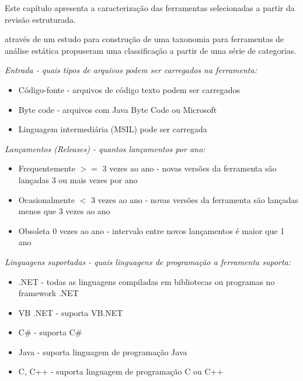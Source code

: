 {Este capítulo apresenta a caracterização das ferramentas selecionadas a partir
da revisão estruturada.}
\label{caracterizacao-ferramentas}

 através de um estudo para construção de uma taxonomia
para ferramentas de análise estática propuseram uma classificação a partir de
uma série de categorias.

\begin{description}

  \item {\it Entrada - quais tipos de arquivos podem ser carregados na ferramenta:}
    \begin{itemize}
      \item Código-fonte - arquivos de código texto podem ser carregados
      \item Byte code - arquivos com Java Byte Code ou Microsoft
      \item Linguagem intermediária (MSIL) pode ser carregada
    \end{itemize}

  \item {\it Lançamentos ({\it Releases}) - quantos lançamentos por ano:}
    \begin{itemize}
      \item Frequentemente $>=$ 3 vezes ao ano - novas versões da ferramenta são lançadas 3 ou mais vezes por ano
      \item Ocasionalmente $<$ 3 vezes ao ano - novas versões da ferramenta são lançadas menos que 3 vezes ao ano
      \item Obsoleta 0 vezes ao ano - intervalo entre novos lançamentos é maior que 1 ano
    \end{itemize}

  \item {\it Linguagens suportadas - quais linguagens de programação a ferramenta suporta:}
    \begin{itemize}
      \item .NET - todas as linguagens compiladas em bibliotecas ou programas no framework .NET
      \item VB .NET - suporta VB.NET
      \item C\# - suporta C\#
      \item Java - suporta linguagem de programação Java
      \item C, C++ - suporta linguagem de programação C ou C++
    \end{itemize}


\end{description}
